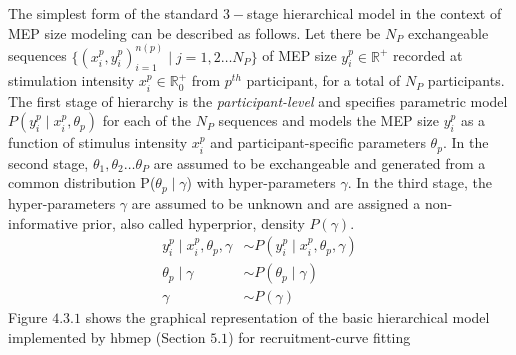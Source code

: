 \documentclass[a4paper,12pt]{article}
\begin{document}
The simplest form of the standard $3-$stage hierarchical model in the context of MEP size modeling can be described as follows. Let there be $N_P$ exchangeable sequences $\{(x_i^p, y_i^p)_{i=1}^{n(p)} \mid j = 1, 2 \ldots N_P\}$ of MEP size $y_i^p \in \mathbb{R}^+$ recorded at stimulation intensity $x_i^p \in \mathbb{R}_0^+$ from $p^{th}$ participant, for  a total of $N_P$ participants.\\

The first stage of hierarchy is the \textit{participant-level} and specifies parametric model $P(y_i^p \mid x_i^p, \theta_p)$ for each of the $N_P$ sequences and models the MEP size $y_i^p$ as a function of stimulus intensity $x_i^p$ and participant-specific parameters $\theta_p$. In the second stage, $\theta_1, \theta_2 \ldots \theta_P$ are assumed to be exchangeable and generated from a common distribution P($\theta_p \mid \gamma$) with hyper-parameters $\gamma$. In the third stage, the hyper-parameters $\gamma$ are assumed to be unknown and are assigned a non-informative prior, also called hyperprior, density $P(\gamma)$.
\begin{align*}
y_i^p \mid x_i^p, \theta_p, \gamma &\sim P(y_i^p \mid x_i^p, \theta_p, \gamma) \tag{4.3.1} \\
\theta_p \mid \gamma &\sim P(\theta_p \mid \gamma) \tag{4.3.2} \\
\gamma &\sim P(\gamma) \tag{4.3.3}
\end{align*}
Figure $4.3.1$ shows the graphical representation of the basic hierarchical model implemented by hbmep (Section $5.1$) for recruitment-curve fitting\\
\end{document}
